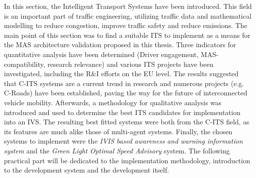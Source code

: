 \documentclass[main.tex]{subfiles}
\begin{document}
In this section, the Intelligent Transport Systems have been introduced. This field is an
important part of traffic engineering, utilizing traffic data and mathematical modelling to
reduce congestion, improve traffic safety and reduce emissions. The main point of this section
was to find a suitable ITS to implement as a means for the MAS architecture validation 
proposed in this thesis. Three indicators for
quantitative analysis have been determined (Driver engagement, MAS-compatibility, research
relevance) and various ITS projects have been investigated, including the R\&I efforts on the
EU level. The results suggested that C-ITS systems are a current trend in research and numerous
projects (e.g. C-Roads) have been established, paving the way for the future of interconnected
vehicle mobility. Afterwards, a methodology for qualitative analysis was introduced and used to
determine the best ITS candidates for implementation into an IVS. The resulting best fitted
systems were both from the C-ITS field, as its features are much alike those of multi-agent
systems. Finally, the chosen systems to implement were the \emph{IVIS based awareness and
warning information system} and the \emph{Green Light Optimal Speed Advisory} system. The
following practical part will be dedicated to the implementation methodology, introduction to
the development system and the development itself.
\clearpage
\end{document}
